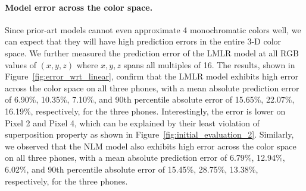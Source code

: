 \paragraph{Model error across the color space.}
%  
Since prior-art models cannot even approximate 4 monochromatic
colors well, we can expect that they will have high prediction errors
in the entire 3-D color space. We further measured
the prediction error of the {LMLR} model at all RGB values of $(x, y,
z)$ where $x, y, z$ spans all multiples of 16. The results, shown
in Figure~\ref{fig:error_wrt_linear}, confirm that the {LMLR} model
exhibits high error across the color space on all three phones,
with a mean absolute prediction error of 6.90\%, 10.35\%, 7.10\%,
and 90th percentile absolute error of  15.65\%, 22.07\%, 16.19\%,
respectively, for the three phones.
Interestingly, the error is lower on Pixel 2 and Pixel 4, which can be explained
by their least violation of superposition property as shown in Figure~\ref{fig:initial_evaluation_2}.
Similarly, we observed that the {NLM} model also
exhibits high error across the color space on all three phones,
with a mean absolute prediction error of 6.79\%, 12.94\%, 6.02\%,
and 90th percentile absolute error of  15.45\%, 28.75\%, 13.38\%,
respectively, for the three phones.

